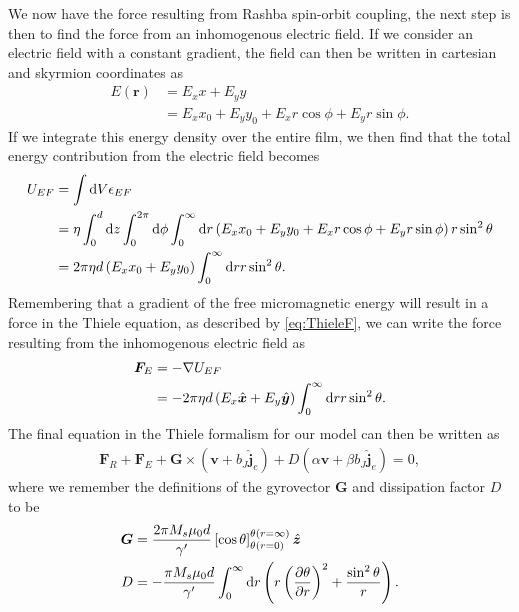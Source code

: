 We now have the force resulting from Rashba spin-orbit coupling, the next step is then to find the force from an inhomogenous electric field. If we consider an electric field with a constant gradient, the field can then be written in cartesian and skyrmion coordinates as
\begin{subequations}
\begin{align}
E(\mathbold{r}) &= E_x x + E_y y \\
&= E_x x_0 + E_y y_0 + E_x r \cos\phi + E_y r \sin\phi.
\end{align}
\end{subequations}
If we integrate this energy density over the entire film, we then find that the total energy contribution from the electric field becomes
\begin{align}
\nonumber U_{EF} &= \int \operatorname{d}\!{V} \epsilon_{EF} \\
\nonumber &= \eta \int_0^d \operatorname{d}\!{z} \int_0^{2\pi}\operatorname{d}\!{\phi} \int_0^{\infty}\operatorname{d}\!{r}\left( E_x x_0 + E_y y_0 + E_x r \cos\phi + E_y r \sin\phi \right) r \sin^2\theta \\
&= 2\pi\eta d\left(E_x x_0 + E_y y_0\right)\int_0^{\infty}\operatorname{d}\!{r} r \sin^2\theta.
\end{align}
Remembering that a gradient of the free micromagnetic energy will result in a force in the Thiele equation, as described by \eqref{eq:ThieleF}, we can write the force resulting from the inhomogenous electric field as
\begin{align}
\nonumber\mathbold{F}_E &= -\mathbold{\nabla}U_{EF} \\
&= -2\pi \eta d \left(E_x \mathbold{\hat{x}} + E_y \mathbold{\hat{y}}\right) \int_0^{\infty}\d r r \sin^2\theta.
\end{align}
The final equation in the Thiele formalism for our model can then be written as
\begin{align}
\mathbold{F}_R+\mathbold{F}_E + \mathbold{G} \times\left(\mathbold{v}+b_J\mathbold{\hat{j}}_e\right) + D\left(\alpha\mathbold{v}+\beta b_J \mathbold{\hat{j}}_e\right) = 0,
\end{align}
where we remember the definitions of the gyrovector $\mathbold{G}$ and dissipation factor $D$ to be
\begin{subequations}
\begin{align}
\mathbold{G} &= \frac{2\pi M_s\mu_0 d}{\gamma'}\left[\cos\theta\right]_{\theta(r=0)}^{\theta(r=\infty)} \mathbold{\hat{z}}\\
D &= - \frac{\pi M_s \mu_0 d}{\gamma '} \int_0^{\infty} \d r \left(r\left(\frac{\partial \theta}{\partial r}\right)^2+\frac{\sin^2\theta}{r}\right).
\end{align}
\end{subequations}
